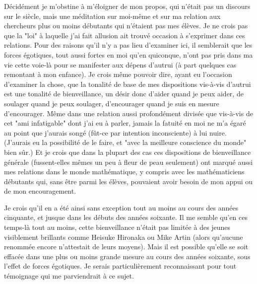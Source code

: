 Décidément je m'obstine à m'éloigner de mon propos, qui n'était pas un discours sur le siècle, mais une méditation sur moi-même et sur ma relation aux chercheurs plus ou moins débutants qui n'étaient pas mes élèves. Je ne crois pas que la "loi" à laquelle j'ai fait allusion ait trouvé occasion à s'exprimer dans ces relations. Pour des raisons qu'il n'y a pas lieu d'examiner ici, il semblerait que les forces égotiques, tout aussi fortes en moi qu'en quiconque, n'ont pas pris dans ma vie cette voie-là pour se manifester aux dépens d'autrui (à part quelques cas remontant à mon enfance). Je crois même pouvoir dire, ayant eu l'occasion d'examiner la chose, que la tonalité de base de mes dispositions vis-à-vis d'autrui est une tonalité de bienveillance, un désir donc d'aider quand je peux aider, de soulager quand je peux soulager, d'encourager quand je suis en mesure d'encourager. Même dans une relation aussi profondément divisée que vis-à-vis de cet "ami infatigable" dont j'ai eu à parler, jamais la fatuité en moi ne m'a égaré au point que j'aurais songé (fût-ce par intention inconsciente) à lui nuire. (J'aurais eu la possibilité de le faire, et "avec la meilleure conscience du monde" bien sûr.) Et je crois que dans la plupart des cas ces dispositions de bienveillance générale (fussent-elles mêmes un peu à fleur de peau seulement) ont marqué aussi mes relations dans le monde mathématique, y compris avec les mathématiciens débutants qui, sans être parmi les élèves, pouvaient avoir besoin de mon appui ou de mon encouragement.

Je crois qu'il en a été ainsi sans exception tout au moins au cours des années cinquante, et jusque dans les débuts des années soixante. Il me semble qu'en ces temps-là tout au moins, cette bienveillance n'était pas limitée à des jeunes visiblement brillants comme Heisuke Hironaka ou Mike Artin (alors qu'aucune renommée encore n'attestait de leurs moyens). Mais il est possible qu'elle se soit effacée dans une plus ou moins grande mesure au cours des années soixante, sous l'effet de forces égotiques. Je serais particulièrement reconnaissant pour tout témoignage qui me parviendrait à ce sujet.

